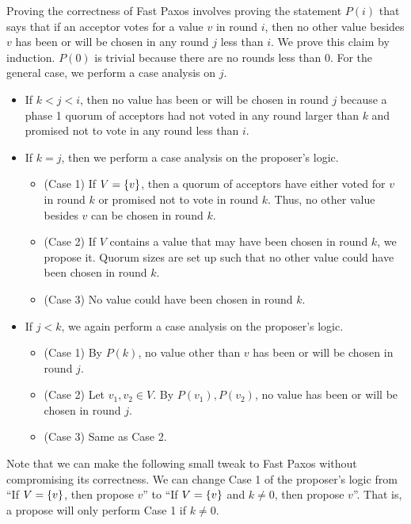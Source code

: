 \documentclass{mwhittaker}
\begin{document}
Proving the correctness of Fast Paxos involves proving the statement $P(i)$
that says that if an acceptor votes for a value $v$ in round $i$, then no
other value besides $v$ has been or will be chosen in any round $j$ less than
$i$. We prove this claim by induction. $P(0)$ is trivial because there are no
rounds less than $0$. For the general case, we perform a case analysis on $j$.
\begin{itemize}
  \item
    If $k < j < i$, then no value has been or will be chosen in round $j$
    because a phase 1 quorum of acceptors had not voted in any round larger
    than $k$ and promised not to vote in any round less than $i$.

  \item
    If $k = j$, then we perform a case analysis on the proposer's logic.
    \begin{itemize}
      \item
        (Case 1) If $V = \{v\}$, then a quorum of acceptors have either voted
        for $v$ in round $k$ or promised not to vote in round $k$. Thus, no
        other value besides $v$ can be chosen in round $k$.
      \item
        (Case 2) If $V$ contains a value that may have been chosen in round
        $k$, we propose it. Quorum sizes are set up such that no other value
        could have been chosen in round $k$.
      \item
        (Case 3) No value could have been chosen in round $k$.
    \end{itemize}

  \item
    If $j < k$, we again perform a case analysis on the proposer's logic.
    \begin{itemize}
      \item
        (Case 1) By $P(k)$, no value other than $v$ has been or will be chosen
        in round $j$.
      \item
        (Case 2) Let $v_1, v_2 \in V$. By $P(v_1), P(v_2)$, no value has been
        or will be chosen in round $j$.
      \item
        (Case 3) Same as Case 2.
    \end{itemize}
\end{itemize}

Note that we can make the following small tweak to Fast Paxos without
compromising its correctness. We can change Case 1 of the proposer's logic from
``If $V = \{v\}$, then propose $v$'' to ``If $V = \{v\}$ and $k \neq 0$,
then propose $v$''. That is, a propose will only perform Case 1 if $k \neq 0$.
\end{document}
